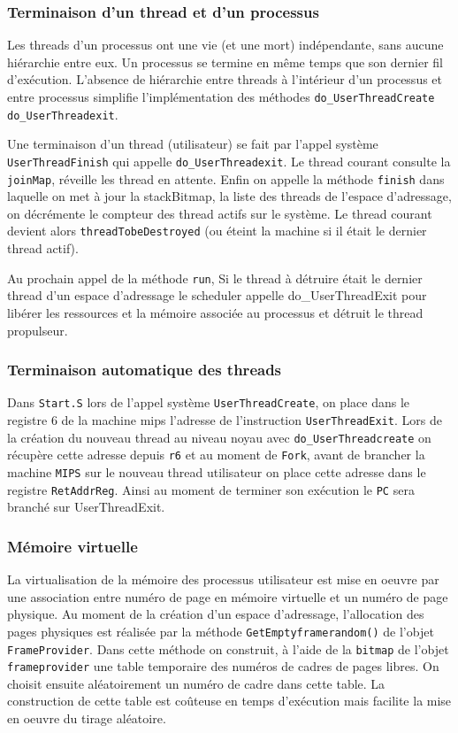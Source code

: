 \documentclass[11pt]{article}
\theoremstyle{definition}
\begin{document}
\subsubsection{Terminaison d'un thread et d'un processus}
Les threads d'un processus ont une vie (et une mort) indépendante, sans aucune hiérarchie entre eux.
Un processus se termine en même temps que son dernier fil d'exécution.
L'absence de hiérarchie entre threads à l'intérieur d'un processus et entre processus simplifie
l'implémentation des méthodes \texttt{do\_UserThreadCreate} \texttt{do\_UserThreadexit}.

Une terminaison d'un thread (utilisateur) se fait par l'appel système \texttt{UserThreadFinish} qui appelle \texttt{do\_UserThreadexit}. Le thread courant consulte la \texttt{joinMap}, réveille les thread en attente. Enfin on appelle la méthode \texttt{finish} dans laquelle on met à jour la stackBitmap, la liste des threads de l'espace d'adressage, on décrémente le compteur des thread actifs sur le système. Le thread courant devient alors \texttt{threadTobeDestroyed} (ou éteint la machine si il était le dernier thread actif).

Au prochain appel de la méthode \texttt{run}, Si le thread à détruire était le dernier thread d'un espace d'adressage le scheduler appelle do\_UserThreadExit pour libérer les ressources et la mémoire associée au processus et détruit le thread propulseur.

\subsubsection{Terminaison automatique des threads}
Dans \texttt{Start.S} lors de l'appel système \texttt{UserThreadCreate}, on place dans le registre 6 de la machine mips l'adresse de l'instruction \texttt{UserThreadExit}.
Lors de la création du nouveau thread au niveau noyau avec \texttt{do\_UserThreadcreate} on récupère
cette adresse depuis \texttt{r6} et au moment de \texttt{Fork}, avant de brancher la machine \texttt{MIPS} sur
le nouveau thread utilisateur on place cette adresse dans le registre \texttt{RetAddrReg}. Ainsi au moment de terminer son exécution le \texttt{PC} sera branché sur UserThreadExit.

\subsubsection{Mémoire virtuelle}
La virtualisation de la mémoire des processus utilisateur est mise en oeuvre par une association entre numéro
de page en mémoire virtuelle et un numéro de page physique. Au moment de la création d'un espace d'adressage, l'allocation des pages physiques est réalisée par la méthode \texttt{GetEmptyframerandom()} de l'objet \texttt{FrameProvider}.
Dans cette méthode on construit, à l'aide de la \texttt{bitmap} de l'objet \texttt{frameprovider} une table temporaire des numéros de cadres de pages libres.
On choisit ensuite aléatoirement un numéro de cadre dans cette table. La construction de cette table est coûteuse en temps d'exécution mais facilite la mise en oeuvre du tirage aléatoire.
\end{document}

